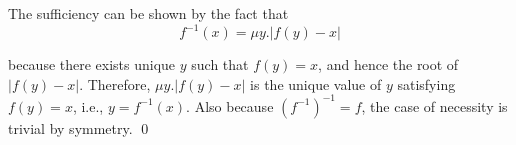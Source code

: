 
\begin{pf} \rm
 The sufficiency can be shown by the fact that 
\[
 f^{-1}(x) = \mu y. |f(y) - x|
\]

\noindent because there exists unique $y$ such that $f(y) = x$,
and hence the root of $|f(y) - x|$. Therefore, $\mu y. |f(y) - x|$ is the unique
value of $y$ satisfying $f(y) = x$, i.e., $y=f^{-1}(x)$.
Also because $\left(f^{-1}\right)^{-1}=f$, the case of necessity is trivial by symmetry. \qed
\end{pf}

